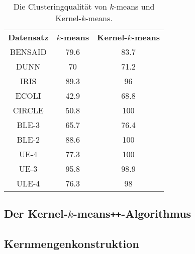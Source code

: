 \begin{table}[t]
\centering
\begin{tabular}{@{}ccc@{}} \toprule
	\textbf{Datensatz} & \textbf{$k$-means} & \textbf{Kernel-$k$-means} \\
	BENSAID & 79.6 & 83.7 \\
	DUNN & 70 & 71.2 \\
	IRIS & 89.3 & 96 \\
	ECOLI & 42.9 & 68.8 \\
	CIRCLE & 50.8 & 100 \\
	BLE-3 & 65.7 & 76.4 \\
	BLE-2 & 88.6 & 100 \\
	UE-4 & 77.3 & 100 \\
	UE-3 & 95.8 & 98.9 \\
	ULE-4 & 76.3 & 98 \\ \bottomrule
\end{tabular}
\caption{Die Clusteringqualität von $k$-means und Kernel-$k$-means.}
\label{tbl:experiment-kernel-method-quality}
\end{table}

\subsection{Der Kernel-\texorpdfstring{$k$}{k}-means\texttt{++}-Algorithmus}
\label{subsection:experiment-kkmpp}

\subsection{Kernmengenkonstruktion}
\label{subsection:experiment-coreset}